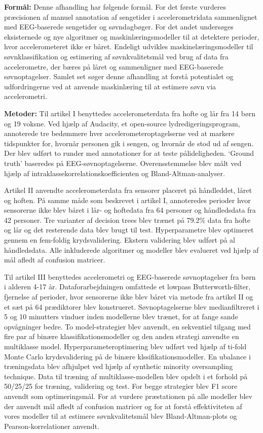 \documentclass[
  10pt,
]{scrbook}
\let\originaltextbf\textbf
\renewcommand{\textbf}[1]{\textcolor{color1}{\textsf{\originaltextbf{#1}}}}
\begin{document}
\textbf{Formål:} Denne afhandling har følgende formål. For det første
vurderes præcisionen af manuel annotation af sengetider i
accelerometridata sammenlignet med EEG-baserede sengetider og
søvndagbøger. For det andet undersøges eksisternede og nye algoritmer og
maskinlæringsmodeller til at detektere perioder, hvor accelerometeret
ikke er båret. Endeligt udvikles maskinelæringsmodeller til
søvnklassifikation og estimering af søvnkvalitetsmål ved brug af data
fra accelerometre, der bæres på låret og sammenligner med EEG-baserede
søvnoptagelser. Samlet set søger denne afhandling at forstå potentialet
og udfordringerne ved at anvende maskinlæring til at estimere søvn via
accelerometri.

\textbf{Metoder:} Til artikel I benyttedes accelerometerdata fra hofte
og lår fra 14 børn og 19 voksne. Ved hjælp af Audacity, et open-source
lydredigeringsprogram, annoterede tre bedømmere hver
accelerometeroptagelserne ved at markere tidspunkter for, hvornår
personen gik i sengen, og hvornår de stod ud af sengen. Der blev udført
to runder med annotationer for at teste pålideligheden. `Ground truth'
baseredes på EEG-søvnoptagelserne. Overensstemmelse blev målt ved hjælp
af intraklassekorrelationskoefficienten og Bland-Altman-analyser.

Artikel II anvendte accelerometerdata fra sensorer placeret på
håndleddet, låret og hoften. På samme måde som beskrevet i artikel I,
annoteredes perioder hvor sensorerne ikke blev båret i lår- og hoftedata
fra 64 personer og håndledsdata fra 42 personer. Tre varianter af
decision trees blev trænet på 79.2\% data fra hofte og lår og det
resterende data blev brugt til test. Hyperparametre blev optimeret
gennem en fem-foldig krydsvalidering. Ekstern validering blev udført på
al håndledsdata. Alle inkluderede algoritmer og modeller blev evalueret
ved hjælp af mål afledt af confusion matricer.

Til artikel III benyttedes accelerometri og EEG-baserede søvnoptagelser
fra børn i alderen 4-17 år. Dataforarbejdningen omfattede et lowpass
Butterworth-filter, fjernelse af perioder, hvor sensorerne ikke blev
båret via metode fra artikel II og et sæt på 64 prædiktorer blev
konstrueret. Søvnoptagelserne blev medianfiltreret i 5 og 10 minutters
vinduer inden modellerne blev trænet, for at fange sande opvågninger
bedre. To model-strategier blev anvendt, en sekventiel tilgang med fire
par af binære klassifikationsmodeller og den anden strategi anvendte en
multiklasse model. Hyperparameteroptimering blev udført ved hjælp af
ti-fold Monte Carlo krydsvalidering på de binære klssifikationsmodeller.
En ubalance i træningsdata blev afhjulpet ved hjælp af synthetic
minority oversampling technique. Data til træning af
multiklasse-modellen blev opdelt i et forhold på 50/25/25 for træning,
validering og test. For begge strategier blev F1 score anvendt som
optimeringsmål. For at vurdere præstationen på alle modeller blev der
anvendt mål afledt af confusion matricer og for at forstå effektiviteten
af vores modeller til at estimere søvnkvalitetsmål blev
Bland-Altman-plots og Pearson-korrelationer anvendt.
\end{document}

